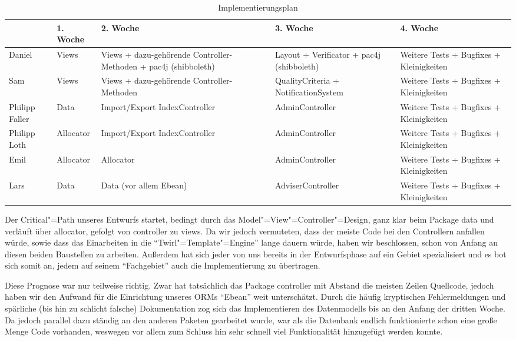 \documentclass[parskip=full]{scrartcl}
\newcommand{\code}[1]{{\ttfamily #1}}
\begin{document}
\begin{table}[H]
\begin{tabularx}{\textwidth}{|l|l|X|X|X|}
\hline
 	& 1. Woche			& 2. Woche		& 3. Woche & 4. Woche\\
\hline 
Daniel	& Views			& Views + dazu-gehörende Controller-Methoden + pac4j 
(shibboleth) & Layout + Verificator
+ pac4j (shibboleth)& Weitere Tests +
Bugfixes +
Kleinigkeiten\\
\hline
Sam & Views&Views +
dazu-gehörende
Controller-
Methoden & QualityCriteria +
NotificationSystem & Weitere Tests +
Bugfixes +
Kleinigkeiten\\
\hline
Philipp Faller&Data&Import/Export
IndexController&AdminController&Weitere Tests +
Bugfixes +
Kleinigkeiten\\
\hline
Philipp Loth&Allocator&Import/Export
IndexController&AdminController&Weitere Tests +
Bugfixes +
Kleinigkeiten\\
\hline
Emil&Allocator&Allocator&AdminController&Weitere Tests +
Bugfixes +
Kleinigkeiten\\
\hline
Lars&Data&Data (vor allem
Ebean)&AdviserController&Weitere Tests +
Bugfixes +
Kleinigkeiten\\
\hline
\end{tabularx}
\caption{Implementierungsplan}
\end{table}
Der Critical"=Path unseres Entwurfs startet, bedingt durch das Model"=View"=Controller"=Design, ganz klar beim Package \code{data} und verläuft über \code{allocator}, gefolgt von \code{controller} zu  \code{views}.
Da wir jedoch vermuteten, dass der meiste Code bei den Controllern anfallen würde, sowie dass das Einarbeiten in die \enquote{Twirl"=Template"=Engine} lange dauern würde, haben wir beschlossen, schon von Anfang an diesen beiden Baustellen zu arbeiten. 
Außerdem hat sich jeder von uns bereits in der Entwurfsphase auf ein Gebiet spezialisiert und es bot sich somit an, jedem auf seinem
\enquote{Fachgebiet} auch die Implementierung zu übertragen.

Diese Prognose war nur teilweise richtig.
Zwar hat tatsächlich das Package \code{controller} mit Abstand die meisten Zeilen Quellcode, jedoch haben wir den Aufwand für die Einrichtung unseres ORMs \enquote{Ebean} weit unterschätzt. Durch die häufig kryptischen Fehlermeldungen und spärliche (bis hin zu schlicht falsche) Dokumentation zog sich das Implementieren des Datenmodells bis an den Anfang der dritten Woche. Da jedoch parallel dazu ständig an den anderen Paketen gearbeitet wurde, war als die Datenbank endlich funktionierte schon eine große Menge Code vorhanden, weswegen vor allem zum Schluss hin sehr schnell viel Funktionalität hinzugefügt werden konnte.
\end{document}
